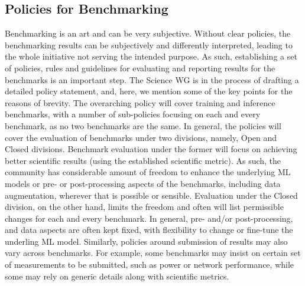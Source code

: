 \subsection{Policies for Benchmarking}

Benchmarking is an art and can be very subjective. Without clear policies, the benchmarking results can be subjectively and differently interpreted, leading to the whole initiative not serving the intended purpose. As such, establishing a set of policies, rules and guidelines for evaluating and reporting results for the benchmarks is an important step. The Science WG is in the process of drafting a detailed policy statement, and, here,  we mention some of the key points for the reasons of brevity.  The overarching policy will cover training and inference benchmarks, with a number of sub-policies focusing on each and every benchmark, as no two benchmarks are the same. In general, the policies will cover the evaluation of benchmarks under two divisions, namely, Open and Closed divisions. Benchmark evaluation under the former will focus on achieving better scientific results (using the established scientific metric). As such, the community has considerable amount of freedom to enhance the underlying ML models or pre- or post-processing aspects of the benchmarks, including data augmentation, wherever that is possible or sensible. Evaluation under the Closed division, on the other hand, limits the freedom and often will list permissible changes for each and every benchmark. In general, pre- and/or post-processing, and data aspects are often kept fixed, with flexibility to change or fine-tune the underling ML model. Similarly, policies around submission of results may also vary across benchmarks. For example, some benchmarks may insist on certain set of measurements to be submitted, such as power or network performance, while some may rely on generic details along with scientific metrics.